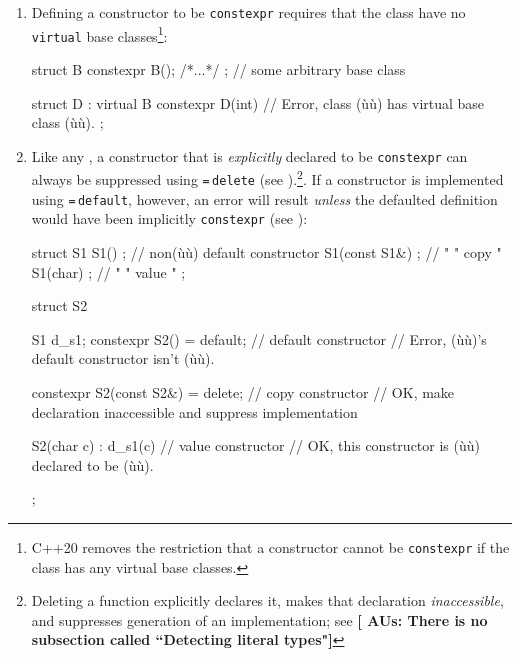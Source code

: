 \begin{enumerate}
\item{Defining a constructor to be \lstinline!constexpr! requires that the class have no \lstinline!virtual! base classes\cprotect\footnote{C++20 removes the restriction that a constructor cannot be \lstinline!constexpr! if the class has any virtual base classes.}:

\begin{emcppslisting}
struct B { constexpr B();  /*...*/ };  // some arbitrary base class

struct D : virtual B
{
    constexpr D(int) { }   // Error, class (ù{}ù) has virtual base class (ù{}ù).
};
\end{emcppslisting}
}

\item{Like any , a constructor that is \emph{explicitly} declared to be \lstinline!constexpr! can always be suppressed using \lstinline!=!\,\lstinline!delete! (see ).\cprotect\footnote{Deleting a function explicitly declares it, makes that declaration \emph{inaccessible}, and suppresses generation of an implementation; see \intrarefsimple{}\textbf{[ AUs: There is no subsection called ``Detecting literal types"]}}. If a constructor is implemented using \lstinline!=!\,\lstinline!default!, however, an error will result \emph{unless} the defaulted definition would have been implicitly \lstinline!constexpr! (see ):

\begin{emcppslisting}
struct S1
{
    S1() { };           // non(ù{}ù) default constructor
    S1(const S1&) { };  //  "      "      copy         "
    S1(char) { };       //  "      "      value        "
};

struct S2
{
    S1 d_s1;
    constexpr S2() = default;          // default constructor
        // Error, (ù{}ù)'s default constructor isn't (ù{}ù).

    constexpr S2(const S2&) = delete;  // copy constructor
        // OK, make declaration inaccessible and suppress implementation

    S2(char c) : d_s1(c) { }           // value constructor
       // OK, this constructor is (ù{}ù) declared to be (ù{}ù).
};
\end{emcppslisting}


}
\end{enumerate}
